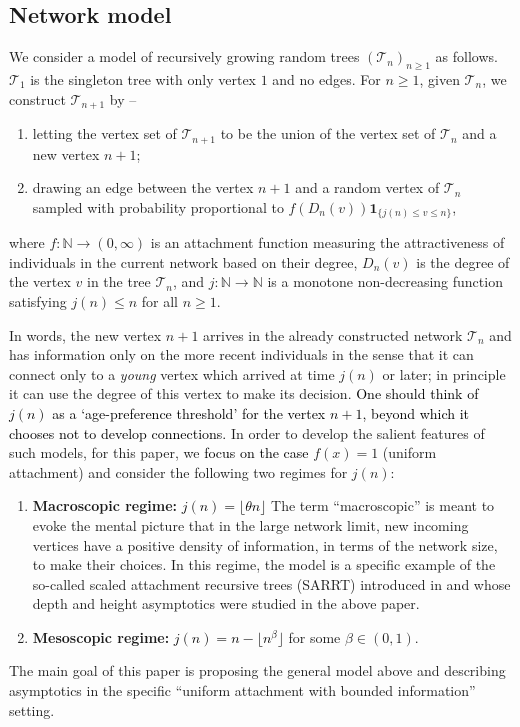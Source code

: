 \documentclass[letterpaper,11pt,reqno]{amsart}
\newenvironment{enumeratei}{\begin{enumerate}[\upshape i)]}{\end{enumerate}}
\newenvironment{enumeratea}{\begin{enumerate}[\upshape a)]\setlength{\itemsep}{1ex}}{\end{enumerate}}
\theoremstyle{definition}
\renewcommand{\leq}{\leqslant}
\renewcommand{\geq}{\geqslant}
\begin{document}
\subsection{Network model}
\label{sec:model}
We consider a model of recursively growing random trees $(\mathcal{T}_n)_{n \geq 1}$ as follows. $\mathcal{T}_1$ is the singleton tree with only vertex $1$ and no edges. For $n\geq 1$, given $\mathcal{T}_n$, we construct $\mathcal{T}_{n+1}$ by -- 
\begin{enumeratei}
    \item letting the vertex set of $\mathcal{T}_{n+1}$ to be the union of the vertex set of $\mathcal{T}_n$ and a new vertex $n+1$;
    \item drawing an edge between the vertex $n+1$ and a random vertex of $\mathcal{T}_n$ sampled with probability proportional to $f(D_n(v))\mathbf{1}_{\{j(n)\leq v \leq n\}}$,
\end{enumeratei}
 where $f:\mathbb{N} \to (0,\infty)$ is an attachment function measuring the attractiveness of individuals in the current network based on their degree, $D_n(v)$ is the degree of the vertex $v$ in the tree $\mathcal{T}_n$, and $j:\mathbb{N}\to \mathbb{N}$ is a monotone {non-decreasing} function satisfying $j(n)\leq n$ for all $n \geq 1$.

 In words, the new vertex $n+1$ arrives in the already constructed network $\mathcal{T}_n$ and has information only on the more recent individuals in the sense that it can connect only to  a \emph{young} vertex which arrived at time $j(n)$ or later; in principle it can use the degree of this vertex to make its decision. \textcolor{black}{One should think of $j(n)$ as a `age-preference threshold' for the vertex $n+1$, beyond which it chooses not to develop connections.} 
 In order to develop the salient features of such models, for this paper, we \textcolor{black}{focus on the case} $f(x)=1$ (uniform attachment) and consider the following two regimes for $j(n)$:
\begin{enumeratea}
    \item {\bf Macroscopic regime:} \textcolor{black}{$j(n)=\lfloor \theta n\rfloor $} %
    The term ``macroscopic'' is meant to evoke the mental picture that in the large network limit, new incoming vertices have a positive density of information, in terms of the network size,  to make their choices. In this regime, the model is a specific example of the so-called scaled attachment recursive trees (SARRT) introduced in \cite{devroye2012depth} and whose depth and height asymptotics were studied in the above paper. 
    \item {\bf Mesoscopic regime:} \textcolor{black}{$j(n)=n-\lfloor n^{\beta}\rfloor$} for some $\beta \in (0,1)$.
\end{enumeratea}
The main goal of this paper is proposing the general model above and describing asymptotics in the specific ``uniform attachment with bounded information'' setting. 
\end{document}
